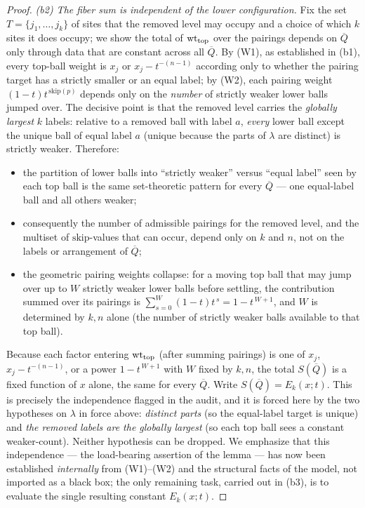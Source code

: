 \begin{proof}
\emph{(b2) The fiber sum is independent of the lower configuration.} Fix the set
$T=\{j_1,\dots,j_k\}$ of sites that the removed level may occupy and a choice of which
$k$ sites it does occupy; we show the total of $\operatorname{wt}_{\mathrm{top}}$ over the
pairings depends on $\overline Q$ only through data that are constant across all
$\overline Q$. By (W1), as established in (b1), every top-ball weight is $x_j$ or
$x_j-t^{-(n-1)}$ according only to whether the pairing target has a strictly smaller
or an equal label; by (W2), each pairing weight $(1-t)t^{\,\mathrm{skip}(p)}$ depends
only on the \emph{number} of strictly weaker lower balls jumped over. The decisive
point is that the removed level carries the \emph{globally largest} $k$ labels:
relative to a removed ball with label $a$, \emph{every} lower ball except the unique
ball of equal label $a$ (unique because the parts of $\lambda$ are distinct) is
strictly weaker. Therefore:
\begin{itemize}
\item the partition of lower balls into ``strictly weaker'' versus ``equal label''
seen by each top ball is the same set-theoretic pattern for every $\overline Q$ ---
one equal-label ball and all others weaker;
\item consequently the number of admissible pairings for the removed level, and the
multiset of $\mathrm{skip}$-values that can occur, depend only on $k$ and $n$, not on
the labels or arrangement of $\overline Q$;
\item the geometric pairing weights collapse: for a moving top ball that may jump over
up to $W$ strictly weaker lower balls before settling, the contribution summed over
its pairings is $\sum_{s=0}^{W}(1-t)t^{\,s}=1-t^{\,W+1}$, and $W$ is determined by
$k,n$ alone (the number of strictly weaker balls available to that top ball).
\end{itemize}
Because each factor entering $\operatorname{wt}_{\mathrm{top}}$ (after summing pairings) is one
of $x_j$, $x_j-t^{-(n-1)}$, or a power $1-t^{\,W+1}$ with $W$ fixed by $k,n$, the
total $S(\overline Q)$ is a fixed function of $x$ alone, the same for every
$\overline Q$. Write $S(\overline Q)=E_k(x;t)$. This is precisely the independence
flagged in the audit, and it is forced here by the two hypotheses on $\lambda$ in
force above: \emph{distinct parts} (so the equal-label target is unique) and
\emph{the removed labels are the globally largest} (so each top ball sees a constant
weaker-count). Neither hypothesis can be dropped. We emphasize that this independence --- the load-bearing
assertion of the lemma --- has now been established \emph{internally} from (W1)--(W2)
and the structural facts of the model, not imported as a black box; the only
remaining task, carried out in (b3), is to evaluate the single resulting constant
$E_k(x;t)$.


\end{proof}
